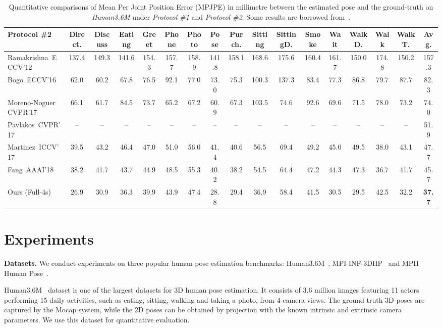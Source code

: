 \documentclass[10pt,twocolumn,letterpaper]{article}
\newcommand{\smalltitle}[1]{\vspace{0.2em}\noindent \textbf{{#1}}}
\begin{document}
\begin{table*}
{\begin{tabular}{@{}lccccccccccccccc|c@{}}
\toprule
			\textbf{Protocol \#2} & Direct. & Discuss & Eating & Greet & Phone & Photo & Pose & Purch. & Sitting & SittingD. & Smoke & Wait & WalkD. & Walk & WalkT. & Avg.\\
			\midrule
			Ramakrishna~\etal ECCV'12~\cite{ramakrishna2012reconstructing} & 137.4 & 149.3 & 141.6 & 154.3 & 157.7 & 158.9 & 141.8 & 158.1 & 168.6 & 175.6 & 160.4 & 161.7 & 150.0 & 174.8 & 150.2 & 157.3\\
			Bogo~\etal ECCV'16~\cite{bogo2016keep} & 62.0 & 60.2 & 67.8 & 76.5 & 92.1 & 77.0 & 73.0 & 75.3 & 100.3 & 137.3 & 83.4 & 77.3 & 86.8 & 79.7 & 87.7 & 82.3\\
			Moreno-Noguer CVPR'17~\cite{moreno20163d} & 66.1 & 61.7 & 84.5 & 73.7 & 65.2 & 67.2 & 60.9 & 67.3 & 103.5 & 74.6 & 92.6 & 69.6 & 71.5 & 78.0 & 73.2 & 74.0\\
			Pavlakos~\etal CVPR'17~\cite{pavlakos2016coarse}  & -- & -- & -- & -- & -- & -- & -- & -- & -- & -- & -- & -- & -- & -- & -- & 51.9\\
			Martinez~\etal ICCV'17~\cite{martinez2017simple} & 39.5 & 43.2&46.4&	47.0&	51.0&	56.0&	41.4&	40.6&	56.5&	69.4&	49.2&	45.0&	49.5&	38.0&	43.1&	47.7\\
			Fang~\etal AAAI'18~\cite{fang2017learning} & 38.2 & 41.7&	43.7&	44.9&	48.5&	55.3&	40.2&	38.2&	54.5&	64.4&	47.2&	44.3&	47.3&	36.7&	41.7&	45.7\\
			\midrule
			Ours (Full-4s) & 26.9 & 30.9 & 36.3 & 39.9 & 43.9 & 47.4 & 28.8 & 29.4 & 36.9 & 58.4 & 41.5 & 30.5 & 29.5 & 42.5 & 32.2 & \bf{37.7}
			\\
			\bottomrule
		\end{tabular}
	}
	\caption{Quantitative comparisons of Mean Per Joint Position Error (MPJPE) in millimetre between the estimated pose and the ground-truth on \textit{Human3.6M} under \textit{Protocol \#1} and \textit{Protocol \#2}. Some results are borrowed from~\cite{fang2017learning}. }
	\vspace{-1em}
	\label{tab:h36m}
\end{table*}


\section{Experiments}
\smalltitle{Datasets.} 
We conduct experiments on three popular human pose estimation benchmarks: Human3.6M~\cite{ionescu2014human36m}, MPI-INF-3DHP~\cite{mehta2017monocular} and MPII Human Pose~\cite{andriluka20142d}. 

Human3.6M~\cite{ionescu2014human36m} dataset is one of the largest datasets for 3D human pose estimation. 
It consists of 3.6 million images featuring 11 actors performing 15 daily activities, such as eating, sitting, walking and taking a photo, from 4 camera views.
The ground-truth 3D poses are captured by the Mocap system, while the 2D poses can be obtained by projection with the known intrinsic and extrinsic camera parameters. 
We use this dataset for quantitative evaluation. 
\end{document}
